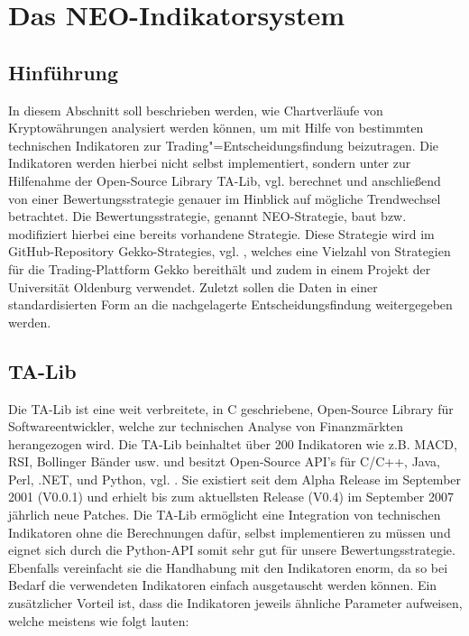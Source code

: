 		

\section{Das NEO-Indikatorsystem}

\subsection{Hinführung}

In diesem Abschnitt soll beschrieben werden, wie Chartverläufe von Kryptowährungen analysiert werden können, um mit Hilfe von bestimmten technischen Indikatoren zur Trading"=Entscheidungsfindung beizutragen. Die Indikatoren werden hierbei nicht selbst implementiert, sondern unter zur Hilfenahme der Open-Source Library TA-Lib, vgl. \cite{taLib} berechnet und anschließend von einer Bewertungsstrategie genauer im Hinblick auf mögliche Trendwechsel betrachtet. Die Bewertungsstrategie, genannt NEO-Strategie, baut bzw. modifiziert hierbei eine bereits vorhandene Strategie. Diese Strategie  wird im GitHub-Repository Gekko-Strategies, vgl. \cite{gekko}, welches eine Vielzahl von Strategien für die Trading-Plattform Gekko bereithält und zudem in einem Projekt der Universität Oldenburg \cite{pro19} verwendet. Zuletzt sollen die Daten in einer standardisierten Form an die nachgelagerte Entscheidungsfindung weitergegeben werden.

\subsection{TA-Lib}

Die TA-Lib ist eine weit verbreitete, in C geschriebene, Open-Source Library für Softwareentwickler, welche zur technischen Analyse von Finanzmärkten herangezogen wird. Die TA-Lib beinhaltet über 200 Indikatoren wie z.B. MACD,  RSI, Bollinger Bänder usw. und besitzt Open-Source API’s für C/C++, Java, Perl, .NET, und Python, vgl. \cite{taLib}. Sie existiert seit dem Alpha Release im September 2001 (V0.0.1) und erhielt bis zum aktuellsten Release (V0.4) im September 2007 jährlich neue Patches. Die TA-Lib ermöglicht eine Integration von technischen Indikatoren ohne die Berechnungen dafür, selbst implementieren zu müssen und eignet sich durch die Python-API somit sehr gut für unsere Bewertungsstrategie. Ebenfalls vereinfacht sie die Handhabung mit den Indikatoren enorm, da so bei Bedarf die verwendeten Indikatoren einfach ausgetauscht werden können. Ein zusätzlicher Vorteil ist, dass die Indikatoren jeweils ähnliche Parameter aufweisen, welche meistens wie folgt lauten:\\

